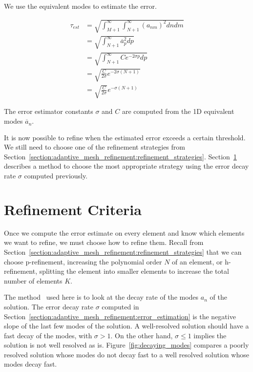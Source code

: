 \noindent
We use the equivalent modes to estimate the error.

\begin{equation}
    \begin{aligned}
        \tau_{est} &= \sqrt{\int_{M+1}^{\infty }\int_{N + 1 }^{\infty}{(a_{nm})}^2 dn dm} \\
        &= \sqrt{\int_{N + 1}^{\infty }\overline{a}_p^2 dp} \\
        &= \sqrt{\int_{N + 1}^{\infty} Ce^{-2\sigma p}dp} \\
        &= \sqrt{\frac{C}{2\sigma}e^{-2\sigma(N + 1)}} \\
        &= \sqrt{\frac{C}{2\sigma}} e^{-\sigma (N + 1)}
    \end{aligned}
\end{equation}

\noindent
The error estimator constants \(\sigma \) and \(C\) are computed from the 1D equivalent modes
\(\overline{a}_n\).

It is now possible to refine when the estimated error exceeds a certain threshold. We still need to
choose one of the refinement strategies from
Section~\ref{section:adaptive_mesh_refinement:refinement_strategies}.
Section~\ref{section:adaptive_mesh_refinement:refinement_criteria} describes a method to choose the
most appropriate strategy using the error decay rate \(\sigma \) computed previously.

\section{Refinement Criteria}\label{section:adaptive_mesh_refinement:refinement_criteria}

Once we compute the error estimate on every element and know which elements we want to refine, we
must choose how to refine them. Recall from
Section~\ref{section:adaptive_mesh_refinement:refinement_strategies} that we can choose
p-refinement, increasing the polynomial order \(N\) of an element, or h-refinement, splitting the
element into smaller elements to increase the total number of elements \(K\).

The method~\cite{Mavriplis1990} used here is to look at the decay rate of the modes \(a_n\) of the
solution. The error decay rate \(\sigma \) computed in
Section~\ref{section:adaptive_mesh_refinement:error_estimation} is the negative slope of the last
few modes of the solution. A well-resolved solution should have a fast decay of the modes, with
\(\sigma > 1\). On the other hand, \(\sigma \leqslant 1\) implies the solution is not well resolved
as is. Figure~\ref{fig:decaying_modes} compares a poorly resolved solution whose modes do not decay
fast to a well resolved solution whose modes decay fast.

